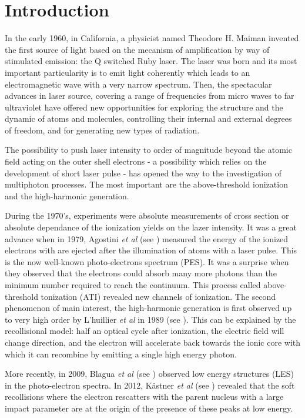 \documentclass[a4paper]{article}
\begin{document}
\newpage
\unboldmath{\tableofcontents}
\newpage

\section{Introduction}

In the early 1960, in California, a physicist named Theodore H. Maiman invented the first source of light based on the mecanism of amplification by way of stimulated emission: the Q switched Ruby laser. The laser was born and its most important particularity is to emit light coherently which leads to an electromagnetic wave with a very narrow spectrum.
Then, the spectacular advances in laser source, covering a range of frequencies from micro waves to far ultraviolet have offered new opportunities for exploring the structure and the dynamic of atoms and molecules, controlling their internal and external degrees of freedom, and for generating new types of radiation. 
\par
The possibility to push laser intensity to order of magnitude beyond the atomic field acting on the outer shell electrons - a possibility which relies on the development of short laser pulse - has opened the way to the investigation of multiphoton processes.
The most important are the above-threshold ionization and the high-harmonic generation.
\par
During the 1970's, experiments were absolute measurements of cross section or absolute dependance of the ionization yields on the lazer intensity.
It was a great advance when in 1979, Agostini \textit{et al} (see \cite{Agostini_1979}) measured the energy of the ionized electrons with are ejected after the illumination of atoms with a laser pulse. This is the now well-known photo-electrons spectrum (PES). It was a surprise when they observed that the electrons could absorb many more photons than the minimum number required to reach the continuum. This process called above-threshold tonization (ATI) revealed new channels of ionization.
The second phenomenon of main interest, the high-harmonic generation is first observed up to very high order by L'huillier \textit{et al} in 1989 (see \cite{Li_1989}). This can be explained by the recollisional model: half an optical cycle after ionization, the electric field will change direction, and the electron will accelerate back towards the ionic core with which it can recombine by emitting a single high energy photon. 
\par
More recently, in 2009, Blagua \textit{et al} (see \cite{Blaga_2009}) observed low energy structures (LES) in the photo-electron spectra. In 2012, K\"astner \textit{et al} (see \cite{Kastner_2012}) revealed that the soft recollisions where the electron rescatters with the parent nucleus with a large impact parameter are at the origin of the presence of these peaks at low energy.
\end{document}
